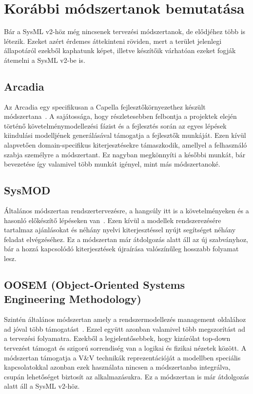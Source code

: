 \section{Korábbi módszertanok bemutatása} \label{sec:KorabbiModszerek}
Bár a SysML v2-höz még nincsenek tervezési módszertanok, de elődjéhez több is létezik.
Ezeket azért érdemes áttekinteni röviden, mert a terület jelenlegi állapotáról ezekből kaphatunk képet, illetve készítőik várhatóan ezeket fogják átemelni a SysML v2-be is.

    \subsection{Arcadia}
    Az Arcadia egy specifikusan a Capella fejlesztőkörnyezethez készült módszertana~\cite{Capella2024}. A sajátossága, hogy részletesebben felbontja a projektek elején történő követelménymodellezési fázist és a fejlesztés során az egyes lépések kiindulási modelljének generálásával támogatja a fejlesztők munkáját.
    Ezen kívül alapvetően domain-specifikus kiterjesztésekre támaszkodik, amellyel a felhasználó szabja személyre a módszertant. Ez nagyban megkönnyíti a későbbi munkát, bár bevezetése így valamivel több munkát igényel, mint más módszertanoké.

    \subsection{SysMOD}
    Általános módszertan rendszertervezésre, a hangsúly itt is a követelményeken és a hasonló előkészítő lépéseken van~\cite{Weilkiens2020}.
    Ezen kívül a modellek rendszerezésére tartalmaz ajánlásokat és néhány nyelvi kiterjesztéssel nyújt segítséget néhány feladat elvégzéséhez.
    Ez a módszertan már átdolgozás alatt áll az új szabványhoz, bár a hozzá kapcsolódó kiterjesztések újraírása valószínűleg hosszabb folyamat lesz.

    \subsection{OOSEM (Object-Oriented Systems Engineering Methodology)}
    Szintén általános módszertan amely a rendszermodellezés management oldalához ad jóval több támogatást~\cite{autoEEsystemEngineer2024}.
    Ezzel együtt azonban valamivel több megszorítást ad a tervezési folyamatra. Ezekből a legjelentősebbek, hogy kizárólat top-down tervezést támogat és szigorú sorrendiség van a logikai és fizikai nézetek között.
    A módszertan támogatja a V\&V technikák reprezentációját a modellben  speciális kapcsolatokkal azonban ezek használata nincsen a módszertanba integrálva, csupán lehetőséget biztosít az alkalmazásukra.
    Ez a módszertan is már átdolgozás alatt áll a SysML v2-höz.

